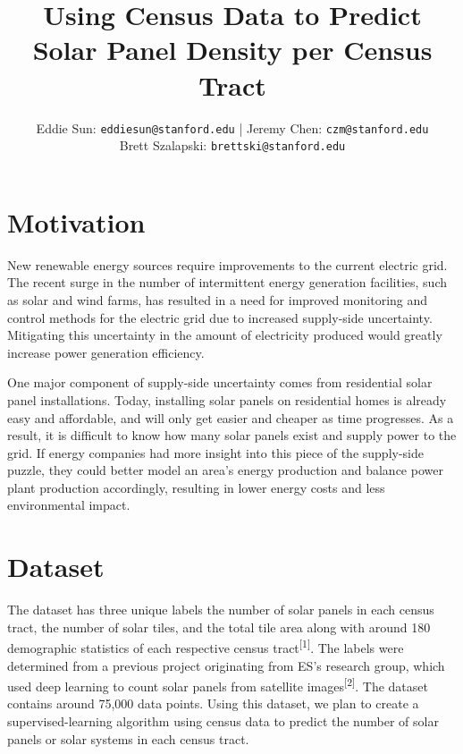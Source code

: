 \documentclass{article}
\title{Using Census Data to Predict Solar Panel Density per Census Tract\vspace{-2ex}}
\author{Eddie Sun: \texttt{eddiesun@stanford.edu} | Jeremy Chen: \texttt{czm@stanford.edu} \\
	Brett Szalapski: \texttt{brettski@stanford.edu}
\vspace{-1ex}}
\date{\vspace{-6ex}}
\begin{document}
	
	\maketitle

	\section{Motivation}
	
	New renewable energy sources require improvements to the current electric grid. The recent surge in the number of intermittent energy generation facilities, such as solar and wind farms, has resulted in a need for improved monitoring and control methods for the electric grid due to increased supply-side uncertainty. Mitigating this uncertainty in the amount of electricity produced would greatly increase power generation efficiency.
	
	One major component of supply-side uncertainty comes from residential solar panel installations. Today, installing solar panels on residential homes is already easy and affordable, and will only get easier and cheaper as time progresses. As a result, it is difficult to know how many solar panels exist and supply power to the grid. If energy companies had more insight into this piece of the supply-side puzzle, they could better model an area’s energy production and balance power plant production accordingly, resulting in lower energy costs and less environmental impact.
	
	
	
	\section{Dataset}
	\label{dataset}
	
	The dataset has three unique labels \textemdash the number of solar panels in each census tract, the number of solar tiles, and the total tile area \textemdash along with around 180 demographic statistics of each respective census tract\textsuperscript{[1]}. The labels were determined from a previous project originating from ES’s research group, which used deep learning to count solar panels from satellite images\textsuperscript{[2]}. The dataset contains around 75,000 data points. Using this dataset, we plan to create a supervised-learning algorithm using census data to predict the number of solar panels or solar systems in each census tract.
	
\end{document}
